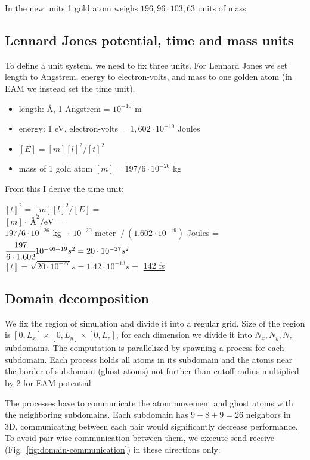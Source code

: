 \documentclass[12pt,a4paper]{article}
\begin{document}
In the new units 1 gold atom weighs $196,96 \cdot 103,63$ units of mass.

\subsection*{Lennard Jones potential, time and mass units}

To define a unit system, we need to fix three units. For Lennard Jones we set length to Angstrem, energy to electron-volts, and mass to one golden atom (in EAM we instead set the time unit).

\begin{itemize}
	\item length: Å, 1 Angstrem = $10^{-10}$ m
	\item energy: 1 eV, electron-volts = $1,602 \cdot 10^{-19}$ Joules
	\item $[E] = [m][l]^2/[t]^2$
	\item mass of 1 gold atom $[m] = 197 / 6 \cdot 10^{-26}$ kg
\end{itemize}

From this I derive the time unit:

\begin{center}
	$[t]^2 = [m][l]^2/[E] =$\\
	$[m] \cdot \ \text{Å}^2 / \text{eV}$ =\\
	$197 / 6 \cdot 10^{-26}$ kg $\ \cdot \ 10^{-20}$ meter $\ / \ (1.602 \cdot 10^{-19})$ Joules =\\
	$\cfrac{197}{6 \cdot 1.602} 10^{-46 + 19} s^2 = 20 \cdot 10^{-27} s^2$\\
	$[t] = \sqrt{20 \cdot 10^{-27}} s = 1.42 \cdot 10^{-13} s =$ \underline{142 fs}
\end{center}

\subsection*{Domain decomposition}

We fix the region of simulation and divide it into a regular grid. Size of the region is $[0, L_x] \times [0, L_y] \times [0, L_z]$, for each dimension we divide it into $N_x, N_y, N_z$ subdomains. The computation is parallelized by spawning a process for each subdomain. Each process holds all atoms in its subdomain and the atoms near the border of subdomain (ghost atoms) not further than cutoff radius multiplied by 2 for EAM potential.

The processes have to communicate the atom movement and ghost atoms with the neighboring subdomains. Each subdomain has $9+8+9=26$ neighbors in 3D, communicating between each pair would significantly decrease performance. To avoid pair-wise communication between them, we execute send-receive (Fig.~\ref{fig:domain-communication}) in these directions only:
\end{document}
